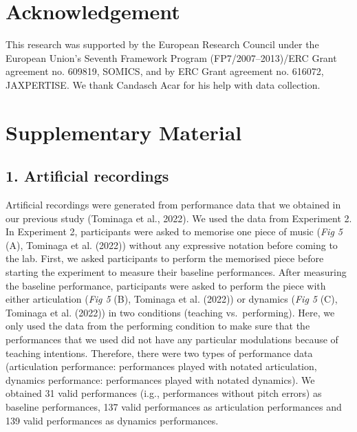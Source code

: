 \documentclass[
  man,floatsintext]{apa6}
\begin{document}
\endgroup

\hypertarget{acknowledgement}{%
\section{Acknowledgement}\label{acknowledgement}}

This research was supported by the European Research Council under the European Union's Seventh Framework Program (FP7/2007--2013)/ERC Grant agreement no. 609819, SOMICS, and by ERC Grant agreement no. 616072, JAXPERTISE. We thank Candasch Acar for his help with data collection.

\clearpage

\hypertarget{supplementary-material}{%
\section{Supplementary Material}\label{supplementary-material}}

\hypertarget{artificial-recordings}{%
\subsection{1. Artificial recordings}\label{artificial-recordings}}

Artificial recordings were generated from performance data that we obtained in our previous study (Tominaga et al., 2022). We used the data from Experiment 2. In Experiment 2, participants were asked to memorise one piece of music (\emph{Fig 5} (A), Tominaga et al. (2022)) without any expressive notation before coming to the lab. First, we asked participants to perform the memorised piece before starting the experiment to measure their baseline performances. After measuring the baseline performance, participants were asked to perform the piece with either articulation (\emph{Fig 5} (B), Tominaga et al. (2022)) or dynamics (\emph{Fig 5} (C), Tominaga et al. (2022)) in two conditions (teaching vs.~performing). Here, we only used the data from the performing condition to make sure that the performances that we used did not have any particular modulations because of teaching intentions. Therefore, there were two types of performance data (articulation performance: performances played with notated articulation, dynamics performance: performances played with notated dynamics). We obtained 31 valid performances (i.g., performances without pitch errors) as baseline performances, 137 valid performances as articulation performances and 139 valid performances as dynamics performances.
\end{document}
